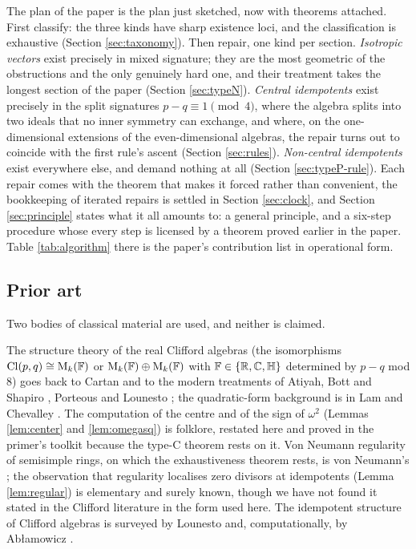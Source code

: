 The plan of the paper is the plan just sketched, now with theorems attached. First classify: the three kinds have sharp existence loci, and the classification is exhaustive (Section \ref{sec:taxonomy}). Then repair, one kind per section. \emph{Isotropic vectors} exist precisely in mixed signature; they are the most geometric of the obstructions and the only genuinely hard one, and their treatment takes the longest section of the paper (Section \ref{sec:typeN}). \emph{Central idempotents} exist precisely in the split signatures $p - q \equiv 1 \pmod 4$, where the algebra splits into two ideals that no inner symmetry can exchange, and where, on the one-dimensional extensions of the even-dimensional algebras, the repair turns out to coincide with the first rule's ascent (Section \ref{sec:rules}). \emph{Non-central idempotents} exist everywhere else, and demand nothing at all (Section \ref{sec:typeP-rule}). Each repair comes with the theorem that makes it forced rather than convenient, the bookkeeping of iterated repairs is settled in Section \ref{sec:clock}, and Section \ref{sec:principle} states what it all amounts to: a general principle, and a six-step procedure whose every step is licensed by a theorem proved earlier in the paper. Table \ref{tab:algorithm} there is the paper's contribution list in operational form.

\subsection*{Prior art}

Two bodies of classical material are used, and neither is claimed.

The structure theory of the real Clifford algebras (the isomorphisms $\mathrm{Cl}(p,q) \cong \mathrm{M}_k(\mathbb{F})$ or $\mathrm{M}_k(\mathbb{F}) \oplus \mathrm{M}_k(\mathbb{F})$ with $\mathbb{F} \in \{\mathbb{R}, \mathbb{C}, \mathbb{H}\}$ determined by $p - q$ mod $8$) goes back to Cartan and to the modern treatments of Atiyah, Bott and Shapiro \cite{ABS1964}, Porteous \cite{Porteous1995} and Lounesto \cite{Lounesto2001}; the quadratic-form background is in Lam \cite{Lam2005} and Chevalley \cite{Chevalley1997}. The computation of the centre and of the sign of $\omega^2$ (Lemmas \ref{lem:center} and \ref{lem:omegasq}) is folklore, restated here and proved in the primer's toolkit \cite[Section 9]{ButlerT0} because the type-C theorem rests on it. Von Neumann regularity of semisimple rings, on which the exhaustiveness theorem rests, is von Neumann's \cite{vonNeumann1936}; the observation that regularity localises zero divisors at idempotents (Lemma \ref{lem:regular}) is elementary and surely known, though we have not found it stated in the Clifford literature in the form used here. The idempotent structure of Clifford algebras is surveyed by Lounesto \cite{Lounesto2001} and, computationally, by Ab{\l}amowicz \cite{Ablamowicz1998}.

